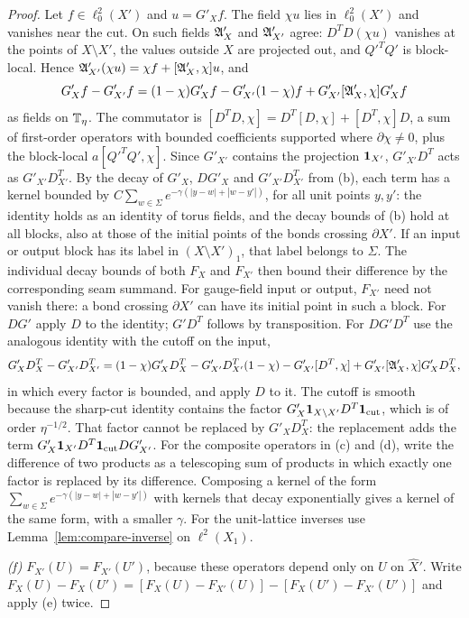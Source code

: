 \begin{proof}
Let $f\in\ell^2_0(X')$ and $u=G'_Xf$. The field $\chi u$ lies in $\ell^2_0(X')$ and vanishes near the cut. On such fields $\mathfrak A'_X$ and $\mathfrak A'_{X'}$ agree: $D^TD(\chi u)$ vanishes at the points of $X\setminus X'$, the values outside $X$ are projected out, and $Q'^TQ'$ is block-local. Hence $\mathfrak A'_{X'}(\chi u)=\chi f+[\mathfrak A'_X,\chi]u$, and
\[
G'_Xf-G'_{X'}f=(1-\chi)G'_Xf-G'_{X'}(1-\chi)f+G'_{X'}[\mathfrak A'_X,\chi]G'_Xf
\]
as fields on $\mathbb T_\eta$. The commutator is $[D^TD,\chi]=D^T[D,\chi]+[D^T,\chi]D$, a sum of first-order operators with bounded coefficients supported where $\partial\chi\ne0$, plus the block-local $a[Q'^TQ',\chi]$. Since $G'_{X'}$ contains the projection $\mathbf 1_{X'}$, $G'_{X'}D^T$ acts as $G'_{X'}D^T_{X'}$. By the decay of $G'_X$, $DG'_X$ and $G'_{X'}D^T_{X'}$ from (b), each term has a kernel bounded by $C\sum_{w\in\Sigma}e^{-\gamma(|y-w|+|w-y'|)}$, for all unit points $y,y'$: the identity holds as an identity of torus fields, and the decay bounds of (b) hold at all blocks, also at those of the initial points of the bonds crossing $\partial X'$. If an input or output block has its label in $(X\setminus X')_1$, that label belongs to $\Sigma$. The individual decay bounds of both $F_X$ and $F_{X'}$ then bound their difference by the corresponding seam summand. For gauge-field input or output, $F_{X'}$ need not vanish there: a bond crossing $\partial X'$ can have its initial point in such a block. For $DG'$ apply $D$ to the identity; $G'D^T$ follows by transposition. For $DG'D^T$ use the analogous identity with the cutoff on the input,
\[
G'_XD^T_X-G'_{X'}D^T_{X'}=(1-\chi)G'_XD^T_X-G'_{X'}D^T_{X'}(1-\chi)-G'_{X'}[D^T,\chi]+G'_{X'}[\mathfrak A'_X,\chi]G'_XD^T_X ,
\]
in which every factor is bounded, and apply $D$ to it. The cutoff is smooth because the sharp-cut identity contains the factor $G'_X\mathbf 1_{X\setminus X'}D^T\mathbf 1_{\rm cut}$, which is of order $\eta^{-1/2}$. That factor cannot be replaced by $G'_XD^T_X$: the replacement adds the term $G'_X\mathbf 1_{X'}D^T\mathbf 1_{\rm cut}DG'_{X'}$. For the composite operators in (c) and (d), write the difference of two products as a telescoping sum of products in which exactly one factor is replaced by its difference. Composing a kernel of the form $\sum_{w\in\Sigma}e^{-\gamma(|y-w|+|w-y'|)}$ with kernels that decay exponentially gives a kernel of the same form, with a smaller $\gamma$. For the unit-lattice inverses use Lemma~\ref{lem:compare-inverse} on $\ell^2(X_1)$.

\emph{(f)} $F_{X'}(U)=F_{X'}(U')$, because these operators depend only on $U$ on $\hat X'$. Write $F_X(U)-F_X(U')=[F_X(U)-F_{X'}(U)]-[F_X(U')-F_{X'}(U')]$ and apply (e) twice.


\end{proof}
